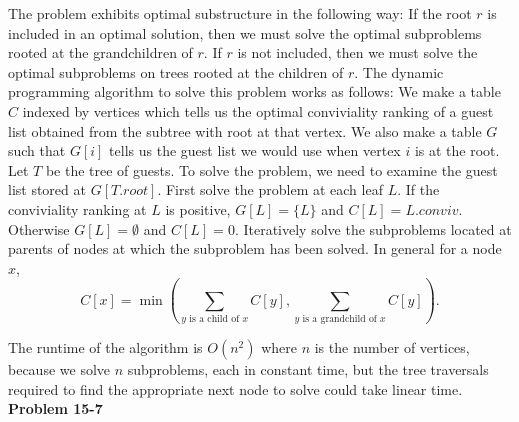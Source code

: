 \documentclass{article}
\begin{document}
The problem exhibits optimal substructure in the following way: If the root $r$ is included in an optimal solution, then we must solve the optimal subproblems rooted at the grandchildren of $r$.  If $r$ is not included, then we must solve the optimal subproblems on trees rooted at the children of $r$.  The dynamic programming algorithm to solve this problem works as follows: We make a table $C$ indexed by vertices which tells us the optimal conviviality ranking of a guest list obtained from the subtree with root at that vertex.  We also make a table $G$ such that $G[i]$ tells us the guest list we would use when vertex $i$ is at the root.  Let $T$ be the tree of guests. To solve the problem, we need to examine the guest list stored at $G[T.root]$.  First solve the problem at each leaf $L$.  If the conviviality ranking at $L$ is positive, $G[L] = \{L\}$ and $C[L] = L.conviv$.  Otherwise $G[L] = \emptyset$ and $C[L] = 0$.  Iteratively solve the subproblems located at parents of nodes at which the subproblem has been solved.  In general for a node $x$, 
\[C[x] = \min\left(\sum_{\mbox{$y$ is a child of $x$}}C[y], \sum_{\mbox{$y$ is a grandchild of $x$}} C[y]\right).\]

The runtime of the algorithm is $O(n^2)$ where $n$ is the number of vertices, because we solve $n$ subproblems, each in constant time, but the tree traversals required to find the appropriate next node to solve could take linear time. \\

\noindent\textbf{Problem 15-7}\\
\end{document}

